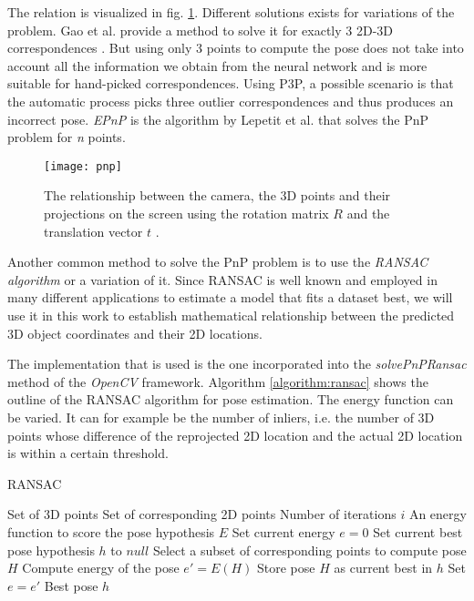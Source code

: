The relation is visualized in fig. \ref{fig:pnp}. Different solutions exists for variations of the problem. Gao et al. provide a method to solve it for exactly 3 2D-3D correspondences \cite{p3p}. But using only 3 points to compute the pose does not take into account all the information we obtain from the neural network and is more suitable for hand-picked correspondences. Using P3P, a possible scenario is that the automatic process picks three outlier correspondences and thus produces an incorrect pose. \textit{EPnP} \cite{epnp} is the algorithm by Lepetit et al. that solves the PnP problem for \textit{n} points.

\begin{figure}[!tbp]
	\centering
    \texttt{[image: pnp]}
    \caption{The relationship between the camera, the 3D points and their projections on the screen using the rotation matrix $R$ and the translation vector $t$ \cite{opencv_pnp}.}
    	\label{fig:pnp}
\end{figure} 

Another common method to solve the PnP problem is to use the \textit{RANSAC algorithm} \cite{ransac} or a variation of it. Since RANSAC is well known and employed in many different applications to estimate a model that fits a dataset best, we will use it in this work to establish mathematical relationship between the predicted 3D object coordinates and their 2D locations. 

The implementation that is used is the one incorporated into the \textit{solvePnPRansac} method of the \textit{OpenCV} \cite{opencv} framework. Algorithm \ref{algorithm:ransac} shows the outline of the RANSAC algorithm for pose estimation. The energy function can be varied. It can for example be the number of inliers, i.e. the number of 3D points whose difference of the reprojected 2D location and the actual 2D location is within a certain threshold.

\begin{algorithm}
\caption{RANSAC} \label{algorithm:ransac}
\begin{algorithmic} 
\REQUIRE Set of 3D points
\REQUIRE Set of corresponding 2D points
\REQUIRE Number of iterations $i$
\REQUIRE An energy function to score the pose hypothesis $E$
\STATE Set current energy $e=0$
\STATE Set current best pose hypothesis $h$ to $null$
\STATE Select a subset of corresponding points to compute pose $H$
\STATE Compute energy of the pose $e'=E(H)$
\STATE Store pose $H$ as current best in $h$
\STATE Set $e = e'$
\ENDIF
\ENDFOR
\RETURN Best pose $h$
\end{algorithmic}
\end{algorithm}